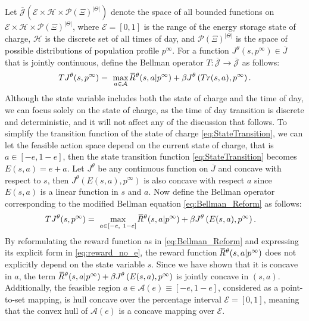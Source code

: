 \documentclass{article}
\theoremstyle{definition}
\theoremstyle{plain}
\newcommand{\overbar}[1]{\mkern1.5mu\overline{\mkern-3.0mu#1\mkern-1mu}\mkern 1.5mu}
\begin{document}
	Let $\overline{\mathcal{J}}(\mathcal{E} \times \mathcal{H} \times \mathcal{P}(\Xi)^{|\Theta|})$ denote the space of all bounded functions on $\mathcal{E} \times \mathcal{H} \times \mathcal{P}(\Xi)^{|\Theta|}$, where $\mathcal{E} = [0, 1]$ is the range of the energy storage state of charge, $\mathcal{H}$ is the discrete set of all times of day, and $\mathcal{P}(\Xi)^{|\Theta|}$ is the space of possible distributions of population profile $p^{\infty}$.  For a function $J^{\theta}(s, p^{\infty}) \in \overline{J}$ that is jointly continuous, define the Bellman operator $T: \overline{\mathcal{J}} \to \overline{\mathcal{J}}$  as follows: 
	\begin{align}
	TJ^{\theta}(s, p^{\infty}) = \ \max_{a\in\mathcal{A}}\overbar{R}^{\theta}(s, a|p^{\infty}) + \beta  J^{\theta}\left(Tr(s,a), p^{\infty}\right). \label{eq:BellmanOperator}
	\end{align}
	Although the state variable includes both the state of charge and the time of day, we can focus solely on the state of charge, as the time of day transition is discrete and deterministic, and it will not affect any of the discussion that follows. 
	To simplify the transition function of the state of charge \eqref{eq:StateTransition}, we can let the feasible action space depend on the current state of charge, that is $a \in [-e, 1-e]$, then the state transition function \eqref{eq:StateTransition} becomes $E(s, a)= e + a$. 
	Let $J^{\theta}$ be any continuous function on $\overline{J}$ and concave with respect to $s$, then  $J^{\theta}(E(s,a),p^{\infty})$ is also concave with respect $a$ since $E(s,a)$ is a linear function in $s$ and $a$. Now define the Bellman operator corresponding to the modified Bellman equation \eqref{eq:Bellman_Reform} as follows: 
	\begin{align}
	& TJ^{\theta}(s, p^{\infty})  = \ \max_{a\in [-e, \ 1-e]}\overbar{R}^{\theta}(s, a|p^{\infty}) + \beta  J^{\theta}\left(E(s,a), p^{\infty}\right). \label{eq:BellmanOperator_Reform}
	\end{align}
	By reformulating the reward function as in \eqref{eq:Bellman_Reform} and expressing its explicit form in \eqref{eq:reward_no_e}, the reward function $\overbar{R}^{\theta}(s, a|p^{\infty})$ does not explicitly depend on the state variable $s$. Since we have shown that it is concave in $a$, the term $\overbar{R}^{\theta}(s, a|p^{\infty}) + \beta  J^{\theta}\left(E(s,a), p^{\infty}\right)$ is jointly concave in $(s,a)$. Additionally, the feasible region \( a \in \mathcal{A}(e) \equiv [-e, 1-e] \), considered as a point-to-set mapping, is hull concave over the percentage interval \( \mathcal{E} = [0, 1] \), meaning that the convex hull of $\mathcal{A}(e)$ is a concave mapping over \( \mathcal{E} \).
\end{document}
